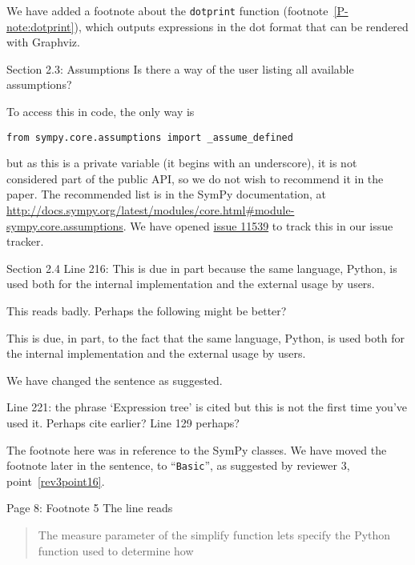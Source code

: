 \documentclass[answers,12pt]{exam}
\begin{document}
\begin{questions}
\begin{solution}
We have added a footnote about the \texttt{dotprint} function (footnote~\ref{P-note:dotprint}),
which outputs expressions in the dot format that can be rendered with Graphviz.
\end{solution}

\question Section 2.3: Assumptions
Is there a way of the user listing all available assumptions?

\begin{solution}
  To access this in code, the only way is
\begin{verbatim}
from sympy.core.assumptions import _assume_defined
\end{verbatim}
  but as this is a private variable (it begins with an underscore), it is not
  considered part of the public API, so we do not wish to recommend it in the
  paper. The recommended list is in the SymPy documentation, at
  \url{http://docs.sympy.org/latest/modules/core.html#module-sympy.core.assumptions}.
  We have opened \href{https://github.com/sympy/sympy/issues/11539}{issue 11539}
  to track this in our issue tracker.
\end{solution}
\question Section 2.4
Line 216: This is due in part because the same language, Python, is used both for the internal implementation and the external usage by users.

This reads badly. Perhaps the following might be better?

This is due, in part, to the fact that the same language, Python, is used both for the internal implementation and the external usage by users.

\begin{solution}
We have changed the sentence as suggested.
\end{solution}
\question Line 221:
the phrase `Expression tree' is cited but this is not the first time you've used it. Perhaps cite earlier? Line 129 perhaps?

\begin{solution}
The footnote here was in reference to the SymPy classes. We have moved the
footnote later in the sentence, to ``\texttt{Basic}'', as suggested
by reviewer 3, point~\ref{rev3point16}.
\end{solution}
\question Page 8: Footnote 5
The line reads

\begin{quote}
The measure parameter of the simplify function lets specify the Python function used to determine how
\end{quote}


\end{questions}
\end{document}
